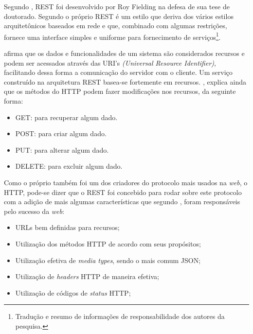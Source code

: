 	
	\par Segundo , REST foi desenvolvido por Roy Fielding
na defesa de sua tese de doutorado. Segundo o próprio 
REST é um estilo que deriva dos vários estilos arquitetônicos baseados em rede
e que, combinado com algumas restrições, fornece uma interface simples e
uniforme para fornecimento de serviços\footnote{Tradução e resumo de
informações de responsabilidade dos autores da pesquisa.}.
			
	\par {} afirma que os dados e funcionalidades de um sistema
são considerados recursos e podem ser acessados através das URI's
\textit{(Universal Resource Identifier)}, facilitando dessa forma a comunicação
do servidor com o cliente. Um serviço construído na arquitetura REST basea-se
fortemente em recursos. , explica ainda que os métodos
do HTTP podem fazer modificações nos recursos, da seguinte forma:
	
	\begin{itemize}
		
		\item GET: para recuperar algum dado. 
		
		\item POST: para criar algum dado.
		
		\item PUT: para alterar algum dado. 
		
		\item DELETE: para excluir algum dado. 
	
	\end{itemize}

	\par Como o próprio  também foi um dos criadores do
protocolo mais usados na \textit{web}, o HTTP, pode-se dizer que o REST foi concebido
para rodar sobre este protocolo com a adição de mais algumas características
que segundo , foram responsáveis pelo sucesso da \textit{web}:
		
	\begin{itemize}
		
		\item URLs bem definidas para recursos;
		
		\item Utilização dos métodos HTTP de acordo com seus propósitos;
			
		\item Utilização efetiva de \textit{media types}, sendo o mais comum JSON;
		
		\item Utilização de \textit{headers} HTTP de maneira efetiva;
		
		\item Utilização de códigos de \textit{status} HTTP;
	
	\end{itemize}
			 
